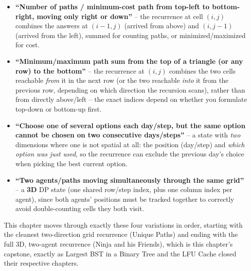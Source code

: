 \begin{patternbox}
\begin{itemize}
  \item \textbf{``Number of paths / minimum-cost path from top-left to
        bottom-right, moving only right or down''} -- the recurrence at
        cell $(i,j)$ combines the answers at $(i-1,j)$ (arrived from
        above) and $(i,j-1)$ (arrived from the left), summed for
        counting paths, or minimized/maximized for cost.
  \item \textbf{``Minimum/maximum path sum from the top of a triangle (or
        any row) to the bottom''} -- the recurrence at $(i,j)$ combines
        the two cells reachable \emph{from} it in the next row (or the
        two reachable \emph{into} it from the previous row, depending on
        which direction the recursion scans), rather than from directly
        above/left -- the exact indices depend on whether you formulate
        top-down or bottom-up first.
  \item \textbf{``Choose one of several options each day/step, but the
        same option cannot be chosen on two consecutive
        days/steps''} -- a state with \emph{two} dimensions where one is
        not spatial at all: the position (day/step) and \emph{which
        option was just used}, so the recurrence can exclude the
        previous day's choice when picking the best current option.
  \item \textbf{``Two agents/paths moving simultaneously through the
        same grid''} -- a \textbf{3D} DP state (one shared row/step index,
        plus one column index per agent), since both agents' positions
        must be tracked together to correctly avoid double-counting
        cells they both visit.
\end{itemize}
\end{patternbox}

This chapter moves through exactly these four variations in order,
starting with the cleanest two-direction grid recurrence (Unique Paths)
and ending with the full 3D, two-agent recurrence (Ninja and his
Friends), which is this chapter's capstone, exactly as Largest BST in a
Binary Tree and the LFU Cache closed their respective chapters.

\newpage







